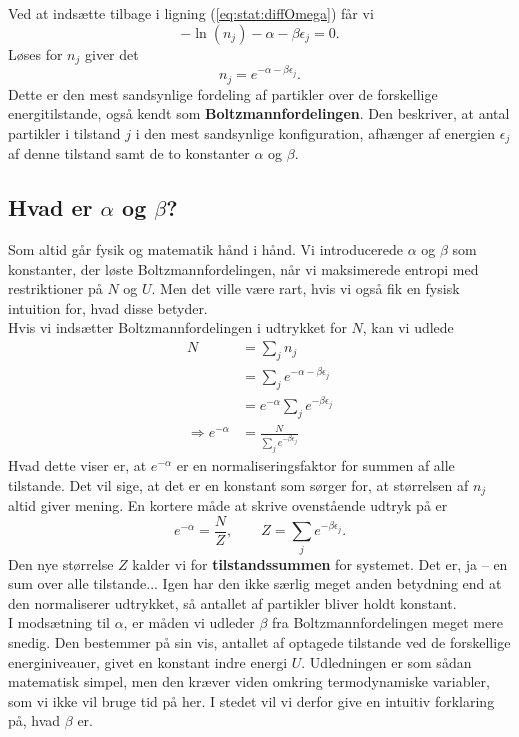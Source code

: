 Ved at indsætte tilbage i ligning (\ref{eq:stat:diffOmega}) får vi
\[ -\ln (n_j) - \alpha-\beta\epsilon_j=0. \]
Løses for $n_j$ giver det
\begin{equation}
	n_j=e^{-\alpha-\beta\epsilon_j}. \label{eq:stat:boltzmann}
\end{equation}
Dette er den mest sandsynlige fordeling af partikler over de forskellige energitilstande, også kendt som \textbf{Boltzmannfordelingen}. Den beskriver, at antal partikler i tilstand $j$ i den mest sandsynlige konfiguration, afhænger af energien $\epsilon_j$ af denne tilstand samt de to konstanter $\alpha$ og $\beta$. 

\subsection{Hvad er $\alpha$ og $\beta$?}
Som altid går fysik og matematik hånd i hånd. Vi introducerede $\alpha$ og $\beta$ som konstanter, der løste Boltzmannfordelingen, når vi maksimerede entropi med restriktioner på $N$ og $U$. Men det ville være rart, hvis vi også fik en fysisk intuition for, hvad disse betyder.\\
\indent Hvis vi indsætter Boltzmannfordelingen i udtrykket for $N$, kan vi udlede
\begin{align*} 
    N&=\sum_j n_j\\
    &=\sum_j e^{-\alpha-\beta\epsilon_j}\\
    &=e^{-\alpha}\sum_j e^{-\beta\epsilon_j}\\
    \Rightarrow e^{-\alpha}&=\frac{N}{\sum_j e^{-\beta\epsilon_j}}
\end{align*}
Hvad dette viser er, at $e^{-\alpha}$ er en normaliseringsfaktor for summen af alle tilstande. Det vil sige, at det er en konstant som sørger for, at størrelsen af $n_j$ altid giver mening. En kortere måde at skrive ovenstående udtryk på er
\[ e^{-\alpha}=\frac{N}{Z},\qquad Z=\sum_j e^{-\beta\epsilon_j}. \]
Den nye størrelse $Z$ kalder vi for \textbf{tilstandssummen} for systemet. Det er, ja -- en sum over alle tilstande... Igen har den ikke særlig meget anden betydning end at den normaliserer udtrykket, så antallet af partikler bliver holdt konstant.\\[12pt]
I modsætning til $\alpha$, er måden vi udleder $\beta$ fra Boltzmannfordelingen meget mere snedig. Den bestemmer på sin vis, antallet af optagede tilstande ved de forskellige energiniveauer, givet en konstant indre energi $U$. Udledningen er som sådan matematisk simpel, men den kræver viden omkring termodynamiske variabler, som vi ikke vil bruge tid på her. I stedet vil vi derfor give en intuitiv forklaring på, hvad $\beta$ er.

